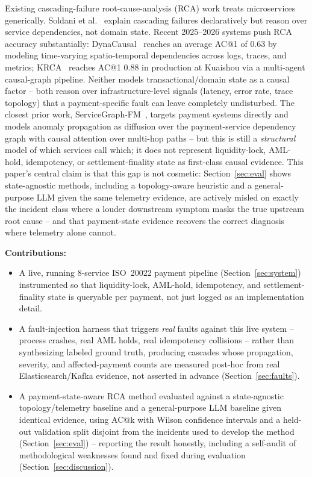 \documentclass[conference]{IEEEtran}
\begin{document}
Existing cascading-failure root-cause-analysis (RCA) work treats
microservices generically. Soldani et al.~\cite{soldani2021} explain
cascading failures declaratively but reason over service dependencies, not
domain state. Recent 2025--2026 systems push RCA accuracy substantially:
DynaCausal~\cite{dynacausal2025} reaches an average AC@1 of 0.63 by modeling
time-varying spatio-temporal dependencies across logs, traces, and metrics;
KRCA~\cite{krca2026} reaches AC@1 0.88 in production at Kuaishou via a
multi-agent causal-graph pipeline. Neither models transactional/domain state
as a causal factor -- both reason over infrastructure-level signals
(latency, error rate, trace topology) that a payment-specific fault can leave
completely undisturbed. The closest prior work,
ServiceGraph-FM~\cite{servicegraphfm2026}, targets payment systems directly
and models anomaly propagation as diffusion over the payment-service
dependency graph with causal attention over multi-hop paths -- but this is
still a \emph{structural} model of which services call which; it does not
represent liquidity-lock, AML-hold, idempotency, or settlement-finality
state as first-class causal evidence. This paper's central claim is that
this gap is not cosmetic: Section~\ref{sec:eval} shows state-agnostic
methods, including a topology-aware heuristic and a general-purpose LLM
given the same telemetry evidence, are actively misled on exactly the
incident class where a louder downstream symptom masks the true upstream
root cause -- and that payment-state evidence recovers the correct
diagnosis where telemetry alone cannot.

\textbf{Contributions:}
\begin{itemize}
  \item A live, running 8-service ISO~20022 payment pipeline
  (Section~\ref{sec:system}) instrumented so that liquidity-lock, AML-hold,
  idempotency, and settlement-finality state is queryable per payment, not
  just logged as an implementation detail.
  \item A fault-injection harness that triggers \emph{real} faults against
  this live system -- process crashes, real AML holds, real idempotency
  collisions -- rather than synthesizing labeled ground truth, producing
  cascades whose propagation, severity, and affected-payment counts are
  measured post-hoc from real Elasticsearch/Kafka evidence, not asserted in
  advance (Section~\ref{sec:faults}).
  \item A payment-state-aware RCA method evaluated against a state-agnostic
  topology/telemetry baseline and a general-purpose LLM baseline given
  identical evidence, using AC@k with Wilson confidence intervals and a
  held-out validation split disjoint from the incidents used to develop the
  method (Section~\ref{sec:eval}) -- reporting the result honestly,
  including a self-audit of methodological weaknesses found and fixed
  during evaluation (Section~\ref{sec:discussion}).
\end{itemize}
\end{document}
